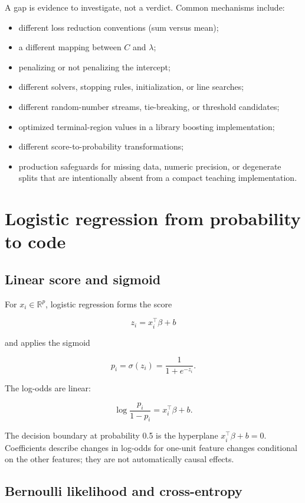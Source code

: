 \documentclass[11pt]{article}
\newcommand{\R}{\mathbb{R}}
\begin{document}
A gap is evidence to investigate, not a verdict. Common mechanisms include:

\begin{itemize}
\item different loss reduction conventions (sum versus mean);
\item a different mapping between $C$ and $\lambda$;
\item penalizing or not penalizing the intercept;
\item different solvers, stopping rules, initialization, or line searches;
\item different random-number streams, tie-breaking, or threshold candidates;
\item optimized terminal-region values in a library boosting implementation;
\item different score-to-probability transformations;
\item production safeguards for missing data, numeric precision, or degenerate
splits that are intentionally absent from a compact teaching implementation.
\end{itemize}

\section{Logistic regression from probability to code}

\subsection{Linear score and sigmoid}

For $x_i\in\R^p$, logistic regression forms the score

\[
 z_i=x_i^\top\beta+b
\]

and applies the sigmoid

\[
 p_i=\sigma(z_i)=\frac{1}{1+e^{-z_i}}.
\]

The log-odds are linear:

\[
 \log\frac{p_i}{1-p_i}=x_i^\top\beta+b.
\]

The decision boundary at probability 0.5 is the hyperplane
$x_i^\top\beta+b=0$. Coefficients describe changes in log-odds for one-unit
feature changes conditional on the other features; they are not automatically
causal effects.

\subsection{Bernoulli likelihood and cross-entropy}
\end{document}
